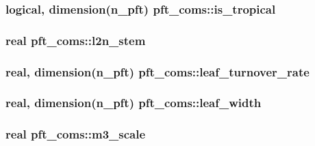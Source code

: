 \subsubsection[{is\+\_\+tropical}]{\setlength{\rightskip}{0pt plus 5cm}logical, dimension(n\+\_\+pft) pft\+\_\+coms\+::is\+\_\+tropical}\label{namespacepft__coms_ae26d357a418f5441d136c81e335cd633}
\hypertarget{namespacepft__coms_aadbb3423514f8f93b48b2a626d4b000d}{}
\subsubsection[{l2n\+\_\+stem}]{\setlength{\rightskip}{0pt plus 5cm}real pft\+\_\+coms\+::l2n\+\_\+stem}\label{namespacepft__coms_aadbb3423514f8f93b48b2a626d4b000d}
\hypertarget{namespacepft__coms_a3c2cfe5a5095b3617d6ef0eda3088d07}{}
\subsubsection[{leaf\+\_\+turnover\+\_\+rate}]{\setlength{\rightskip}{0pt plus 5cm}real, dimension(n\+\_\+pft) pft\+\_\+coms\+::leaf\+\_\+turnover\+\_\+rate}\label{namespacepft__coms_a3c2cfe5a5095b3617d6ef0eda3088d07}
\hypertarget{namespacepft__coms_ac9aba7609beabf8387afac8a12a89d5c}{}
\subsubsection[{leaf\+\_\+width}]{\setlength{\rightskip}{0pt plus 5cm}real, dimension(n\+\_\+pft) pft\+\_\+coms\+::leaf\+\_\+width}\label{namespacepft__coms_ac9aba7609beabf8387afac8a12a89d5c}
\hypertarget{namespacepft__coms_ad41cac7d6fa0b8d962cf3acd1d4b1587}{}
\subsubsection[{m3\+\_\+scale}]{\setlength{\rightskip}{0pt plus 5cm}real pft\+\_\+coms\+::m3\+\_\+scale}\label{namespacepft__coms_ad41cac7d6fa0b8d962cf3acd1d4b1587}
\hypertarget{namespacepft__coms_a27553d075979c77be9aceaf78a289109}{}
